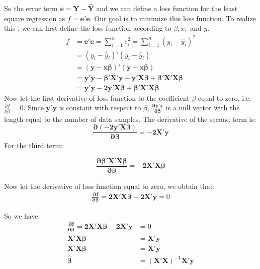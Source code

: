 So the error term $\bm{e=Y-\hat{Y}}$ and we can define a loss function for the least square regression as $f=\bm{e'e}$. Our goal is to minimize this loss function. To realize this , we can first define the loss function according to $\beta, x, $ and $y$.
\begin{equation}
\begin{aligned}
f&=\bm{e'e}=\sum_{i=1}^{n}e_i^2=\sum_{i=1}^{n}(y_i-\hat{y}_i)^2\\
&=(y_i-\hat{y}_i)'(y_i-\hat{y}_i)\\
&=\bm{(y-\bm{x\beta})'(y-\bm{x\beta})}\\
&=\bm{y'y-\beta'X'y-y'X\beta+\beta'X'X\beta}\\
&=\bm{y'y-2y'X\beta+\beta'X'X\beta}
\end{aligned}
\end{equation} 
Now let the first derivative of loss function to the coefficient $\beta$ equal to zero,  i.e. $\frac{\partial f}{\partial \beta}=0$. Since $\bm{y'y}$ is constant with respect to $\beta$,  $\bm{\frac{\partial y'y}{\partial \beta}}$ is a null vector with the length equal to the number of data samples. The derivative of the second term is: \\
\begin{equation}
\bm{\frac{\partial (-2y'X\beta)}{\partial \beta}=-2X'y}
\end{equation}
For the third term: 

\begin{equation}
\bm{\frac{\partial \beta'X'X\beta}{\partial \beta}=-2X'X\beta}
\end{equation}

Now let the derivative of loss function equal to zero,  we obtain that: 
\begin{equation}
\begin{aligned}
\bm{\frac{\partial f}{\partial \beta}=2X'X\beta-2X'y}=0
\end{aligned}
\end{equation}

So we have: 
\begin{equation}
\begin{aligned}
\bm{\frac{\partial f}{\partial \beta}=2X'X\beta-2X'y}&=0\\
\bm{X'X\beta} &=\bm{X'y}\\
\bm{X'X\beta} &=\bm{X'y}\\
\bm{\hat{\beta} }&=\bm{(X'X)^{-1}X'y}
\end{aligned}
\end{equation}

